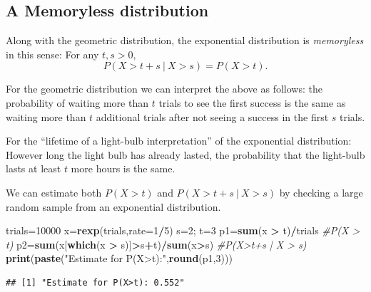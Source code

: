 \documentclass[
]{book}
\newenvironment{Shaded}{\begin{snugshade}}{\end{snugshade}}
\newcommand{\AttributeTok}[1]{\textcolor[rgb]{0.13,0.29,0.53}{#1}}
\newcommand{\CommentTok}[1]{\textcolor[rgb]{0.56,0.35,0.01}{\textit{#1}}}
\newcommand{\DecValTok}[1]{\textcolor[rgb]{0.00,0.00,0.81}{#1}}
\newcommand{\FunctionTok}[1]{\textcolor[rgb]{0.13,0.29,0.53}{\textbf{#1}}}
\newcommand{\NormalTok}[1]{#1}
\newcommand{\OtherTok}[1]{\textcolor[rgb]{0.56,0.35,0.01}{#1}}
\newcommand{\SpecialCharTok}[1]{\textcolor[rgb]{0.81,0.36,0.00}{\textbf{#1}}}
\newcommand{\StringTok}[1]{\textcolor[rgb]{0.31,0.60,0.02}{#1}}
\theoremstyle{definition}
\theoremstyle{definition}
\theoremstyle{definition}
\theoremstyle{definition}
\theoremstyle{remark}
\begin{document}
\subsection*{A Memoryless distribution}\label{a-memoryless-distribution}

Along with the geometric distribution, the exponential distribution is \emph{memoryless} in this sense: For any \(t,s>0,\) \[P(X > t + s~|~X > s) = P(X > t).\]

For the geometric distribution we can interpret the above as follows: the probability of waiting more than \(t\) trials to see the first success is the same as waiting more than \(t\) additional trials after not seeing a success in the first \(s\) trials.

For the ``lifetime of a light-bulb interpretation'' of the exponential distribution: However long the light bulb has already lasted, the probability that the light-bulb lasts at least \(t\) more hours is the same.

We can estimate both \(P(X>t)\) and \(P(X>t+s ~|~ X>s)\) by checking a large random sample from an exponential distribution.

\begin{Shaded}
\begin{Highlighting}[]
\NormalTok{trials}\OtherTok{=}\DecValTok{10000}
\NormalTok{x}\OtherTok{=}\FunctionTok{rexp}\NormalTok{(trials,}\AttributeTok{rate=}\DecValTok{1}\SpecialCharTok{/}\DecValTok{5}\NormalTok{)}
\NormalTok{s}\OtherTok{=}\DecValTok{2}\NormalTok{; t}\OtherTok{=}\DecValTok{3}
\NormalTok{p1}\OtherTok{=}\FunctionTok{sum}\NormalTok{(x }\SpecialCharTok{\textgreater{}}\NormalTok{ t)}\SpecialCharTok{/}\NormalTok{trials }\CommentTok{\#P(X \textgreater{} t)}
\NormalTok{p2}\OtherTok{=}\FunctionTok{sum}\NormalTok{(x[}\FunctionTok{which}\NormalTok{(x }\SpecialCharTok{\textgreater{}}\NormalTok{ s)]}\SpecialCharTok{\textgreater{}}\NormalTok{s}\SpecialCharTok{+}\NormalTok{t)}\SpecialCharTok{/}\FunctionTok{sum}\NormalTok{(x}\SpecialCharTok{\textgreater{}}\NormalTok{s) }\CommentTok{\#P(X\textgreater{}t+s | X \textgreater{} s)}
\FunctionTok{print}\NormalTok{(}\FunctionTok{paste}\NormalTok{(}\StringTok{"Estimate for P(X\textgreater{}t):"}\NormalTok{,}\FunctionTok{round}\NormalTok{(p1,}\DecValTok{3}\NormalTok{)))}
\end{Highlighting}
\end{Shaded}

\begin{verbatim}
## [1] "Estimate for P(X>t): 0.552"
\end{verbatim}
\end{document}
